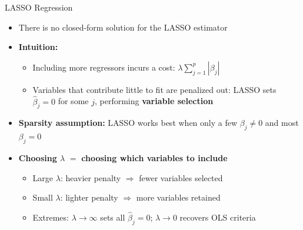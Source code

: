 \documentclass[hyperref={pdfpagelabels=false}]{beamer}
\begin{document}
\begin{frame}{LASSO Regression}
    \begin{itemize}
        \item There is no closed-form solution for the LASSO estimator
        \vspace{0.2cm}
        \item \textbf{Intuition:}
        \begin{itemize}
            \vspace{0.2cm}
            \item Including more regressors incurs a cost: 
            $\lambda \sum^{p}_{j=1} |\beta_{j}|$
            \vspace{0.2cm}
            \item Variables that contribute little to fit are 
            penalized out: LASSO sets $\hat{\beta}_{j} = 0$ 
            for some $j$, performing \textbf{variable selection}
        \end{itemize}
        \vspace{0.2cm}
        \item \textbf{Sparsity assumption:} LASSO works best when 
        only a few $\beta_j \neq 0$ and most $\beta_j = 0$
        \vspace{0.2cm}
        \item \textbf{Choosing $\lambda$} $=$ \textbf{choosing which variables to include}
        \begin{itemize}
            \vspace{0.2cm}
            \item Large $\lambda$: heavier penalty $\Rightarrow$ fewer variables selected
            \vspace{0.2cm}
            \item Small $\lambda$: lighter penalty $\Rightarrow$ more variables retained
            \vspace{0.2cm}
            \item Extremes: $\lambda \to \infty$ sets all $\hat{\beta}_j = 0$; 
            $\lambda \to 0$ recovers OLS
            criteria 
        \end{itemize}
    \end{itemize}
\end{frame}
\end{document}
